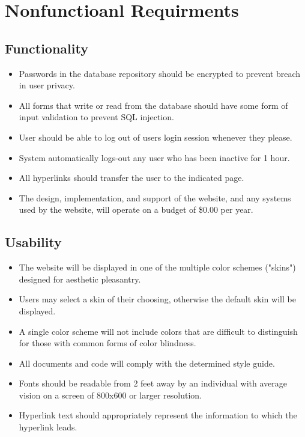 %

\section{Nonfunctioanl Requirments}

	\subsection{Functionality}
	\begin{itemize}
		\item Passwords in the database repository should be encrypted to prevent breach in user privacy.
		\item All forms that write or read from the database should have some form of input validation to prevent SQL injection.
		\item User should be able to log out of users login session whenever they please.
		\item System automatically logs-out any user who has been inactive for 1 hour.
		\item All hyperlinks should transfer the user to the indicated page.
		\item The design, implementation, and support of the website, and any systems used by the website, will operate on a budget of \$0.00 per year.
	\end{itemize}
	
	\subsection{Usability}
	\begin{itemize}
		\item The website will be displayed in one of the multiple color schemes ("skins") designed for aesthetic pleasantry.
		\item Users may select a skin of their choosing, otherwise the default skin will be displayed.
		\item A single color scheme will not include colors that are difficult to distinguish for those with common forms of color blindness.
		\item All documents and code will comply with the determined style guide.
		\item Fonts should be readable from 2 feet away by an individual with average vision on a screen of 800x600 or larger resolution.
		\item Hyperlink text should appropriately represent the information to which the hyperlink leads.
	\end{itemize}
	
